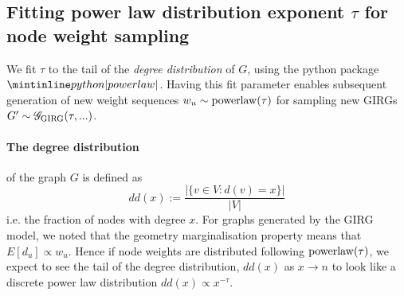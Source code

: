 


\subsection{Fitting power law distribution exponent $\tau$ for node weight sampling}
We fit $\tau$ to the tail of the \textit{degree distribution} of $G$, using the python package $\PLP$. Having this fit parameter enables subsequent generation of new weight sequences $w_u \sim \operatorname{powerlaw}(\tau)$ for sampling new GIRGs $G' \sim \mathscr{G}_{\mathrm{GIRG}}(\tau,...)$.

\paragraph{The degree distribution} of the graph $G$ is defined as
\begin{equation}
    dd(x) := \frac{|\{v \in V: d(v) = x\}|}{|V|}
\end{equation}
i.e. the fraction of nodes with degree $x$. For graphs generated by the GIRG model, we noted that the geometry marginalisation property means that $E[d_u] \propto w_u$. Hence if node weights are distributed following $\operatorname{powerlaw}(\tau)$, we expect to see the tail of the degree distribution, $dd(x)$ as $x \to n$ to look like a discrete power law distribution $dd(x) \propto x^{-\tau}$.

